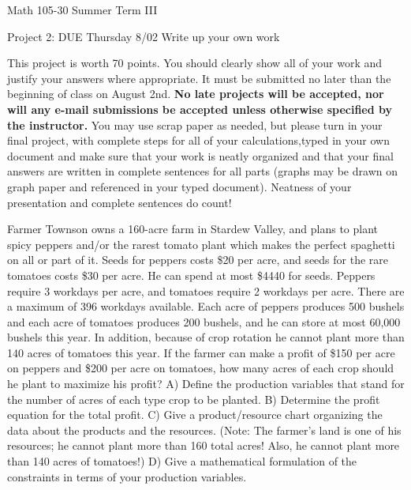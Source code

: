 \documentclass[11pt,epsfig]{article}
\begin{document}
Math 105-30 Summer Term III 

Project 2: DUE Thursday 8/02
\newline
Write up your own work
\vspace{1pc}

This project is worth 70 points. You should clearly show all of your work and justify your answers where appropriate. It must be submitted no later than the beginning of class on August 2nd. \textbf{No late projects will be accepted, nor will any e-mail submissions be accepted unless otherwise specified by the instructor.} You may use scrap paper as needed, but please turn in your final project, with complete steps for all of your calculations,typed in your own document and make sure that your work is neatly organized and that your final answers are written in complete sentences for all parts (graphs may be drawn on graph paper and referenced in your typed document). Neatness of your presentation and complete sentences do count! \bigskip
\vspace{0.5pc}






\begin{problem}{25}
Farmer Townson owns a 160-acre farm in Stardew Valley, and plans to plant spicy peppers and/or the rarest tomato plant which makes the perfect spaghetti on all or part of it. Seeds for peppers costs \$20 per acre, and seeds for the rare tomatoes costs \$30 per acre. He can spend at most \$4440 for seeds. Peppers require 3 workdays per acre, and tomatoes require 2 workdays per acre. There are a maximum of 396 workdays available. Each acre of peppers produces 500 bushels and each acre of tomatoes produces 200 bushels, and he can store at most 60,000 bushels this year. In addition, because of crop rotation he cannot plant more than 140 acres of tomatoes this year. If the farmer can make a profit of \$150 per acre on peppers and \$200 per acre on tomatoes, how many acres of each crop should he plant to maximize his profit?
\newline
A) Define the production variables that stand for the number of acres of each type crop to be planted.
\newline
B) Determine the profit equation for the total profit.
\newline 
C) Give a product/resource chart organizing the data about the products and the resources.
(Note: The farmer’s land is one of his resources; he cannot plant more than 160 total acres!
Also, he cannot plant more than 140 acres of tomatoes!)
\newline
D) Give a mathematical formulation of the constraints in terms of your production variables.
\vfill
\end{problem}
\end{document}
